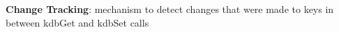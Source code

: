 \label{doc_contrib_contrib-glossary_md_md_doc_contrib_contrib_glossary}%
%

\begin{DoxyItemize}
\item {\bfseries{Change Tracking}}\+: mechanism to detect changes that were made to keys in between {\ttfamily kdb\+Get} and {\ttfamily kdb\+Set} calls 
\end{DoxyItemize}